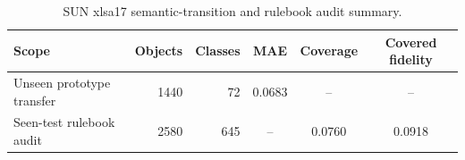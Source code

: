 \begin{table}[H]
\caption{SUN xlsa17 semantic-transition and rulebook audit summary.\label{tab:sun_summary}}
\centering
\small
\begin{tabular}{lrrccc}
\toprule
Scope & Objects & Classes & MAE & Coverage & Covered fidelity \\
\midrule
Unseen prototype transfer & 1440 & 72 & 0.0683 & -- & -- \\
Seen-test rulebook audit & 2580 & 645 & -- & 0.0760 & 0.0918 \\
\bottomrule
\end{tabular}
\end{table}
